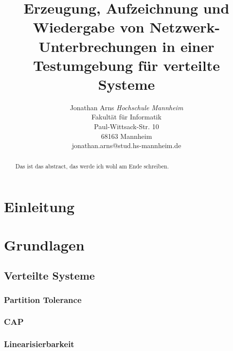 \documentclass[12pt,a4paper]{report}
\begin{document}
\title{Erzeugung, Aufzeichnung und Wiedergabe von Netzwerk-Unterbrechungen in einer Testumgebung für verteilte Systeme}


\author{Jonathan Arns
	\textit{Hochschule Mannheim} \\
	Fakultät für Informatik\\
	Paul-Wittsack-Str. 10\\
	68163 Mannheim\\
	jonathan.arns@stud.hs-mannheim.de
}

\maketitle

\tableofcontents
\setlength{\parskip}{0.6em}


\begin{abstract}
	Das ist das abstract, das werde ich wohl am Ende schreiben.
\end{abstract}


\chapter{Einleitung}
\cite{analysis_of_network_partition_failures}

\chapter{Grundlagen}

\section{Verteilte Systeme}
\subsection{Partition Tolerance}
\subsection{CAP}
\subsection{Linearisierbarkeit}
\end{document}
